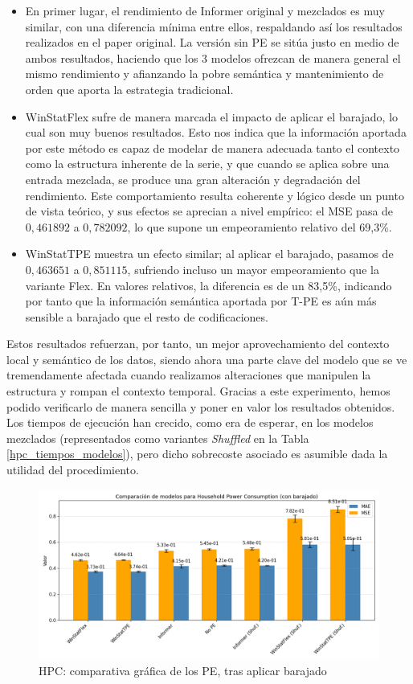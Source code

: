 \begin{itemize}
	\item En primer lugar, el rendimiento de Informer original y mezclados es muy similar, con una diferencia mínima entre ellos, respaldando así los resultados realizados en el paper original. La versión sin PE se sitúa justo en medio de ambos resultados, haciendo que los 3 modelos ofrezcan de manera general el mismo rendimiento y afianzando la pobre semántica y mantenimiento de orden que aporta la estrategia tradicional.
	\item WinStatFlex sufre de manera marcada el impacto de aplicar el barajado, lo cual son muy buenos resultados. Esto nos indica que la información aportada por este método es capaz de modelar de manera adecuada tanto el contexto como la estructura inherente de la serie, y que cuando se aplica sobre una entrada mezclada, se produce una gran alteración y degradación del rendimiento. Este comportamiento resulta coherente y lógico desde un punto de vista teórico, y sus efectos se aprecian a nivel empírico: el MSE pasa de $0,461892$ a $0,782092$, lo que supone un empeoramiento relativo del 69,3\%.
	\item WinStatTPE muestra un efecto similar; al aplicar el barajado, pasamos de $0,463651$ a $0,851115$, sufriendo incluso un mayor empeoramiento que la variante Flex. En valores relativos, la diferencia es de un 83,5\%, indicando por tanto que la información semántica aportada por T-PE es aún más sensible a barajado que el resto de codificaciones.
\end{itemize}

Estos resultados refuerzan, por tanto, un mejor aprovechamiento del contexto local y semántico de los datos, siendo ahora una parte clave del modelo que se ve tremendamente afectada cuando realizamos alteraciones que manipulen la estructura y rompan el contexto temporal. Gracias a este experimento, hemos podido verificarlo de manera sencilla y poner en valor los resultados obtenidos. Los tiempos de ejecución han crecido, como era de esperar, en los modelos mezclados (representados como variantes \textit{Shuffled} en la Tabla \ref{hpc_tiempos_modelos}), pero dicho sobrecoste asociado es asumible dada la utilidad del procedimiento.\\

\begin{figure}[!ht]
	\centering
	\includegraphics[scale=0.475]{img/hpcgraphshuffled}
	\caption{HPC: comparativa gráfica de los PE, tras aplicar barajado}
	\label{hpcgraphshuffled}
\end{figure}

